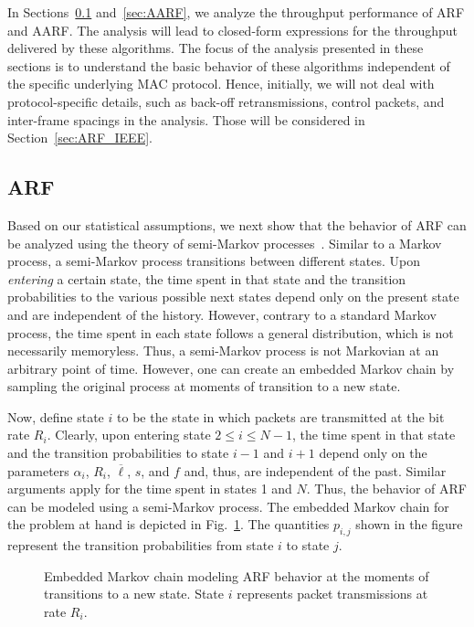\documentclass[11pt, journal, letterpaper, oneside, onecolumn]{IEEEtran}
\newcommand{\linegap}{1}
\begin{document}
In Sections~\ref{sec:ARF} and~\ref{sec:AARF},  we analyze the throughput performance of ARF and AARF. The analysis will lead to closed-form expressions for the
throughput delivered by these algorithms. The focus of the
analysis presented in these sections is to understand the basic
behavior of these algorithms independent of the specific underlying
MAC protocol. Hence, initially, we will not deal with protocol-specific
details, such as back-off retransmissions, control packets, and inter-frame spacings in the analysis. Those will be considered in Section~\ref{sec:ARF_IEEE}.

\subsection{ARF}
\label{sec:ARF}

Based on our statistical assumptions, we next show that the behavior
of ARF can be analyzed using the theory of semi-Markov
processes~\cite{ROSS}. Similar to a Markov process, a semi-Markov
process transitions between different states. Upon \emph{entering} a
certain state, the time spent in that state and the transition
probabilities to the various possible next states depend only on the
present state and are independent of the history. However, contrary
to a standard Markov process, the time spent in each state follows a
general distribution, which is not necessarily memoryless. Thus, a
semi-Markov process is not Markovian at an arbitrary point of time.
However, one can create an embedded Markov chain by sampling the
original process at moments of transition to a new state.

Now, define state $i$ to be the state in which packets are
transmitted at the bit rate $R_i$. Clearly, upon entering state $2
\leq i \leq N-1$, the time spent in that state and the transition
probabilities to state $i-1$ and $i+1$ depend only on the
parameters $\alpha_i$, $R_i$, $\overline{\ell}$, $s$,  and $f$
and, thus, are independent of the past.
Similar arguments apply for the time spent in states 1 and $N$.
Thus, the  behavior of ARF can be modeled using a semi-Markov
process. The embedded Markov chain for the problem at hand is
depicted in Fig.~\ref{fig:ARF-Macro}. The quantities $p_{i,j}$
shown in the figure represent the transition probabilities from
state $i$ to state $j$.

\begin{figure}[t]
\centering
{}
\caption{Embedded Markov chain modeling  ARF behavior at the
moments of transitions to a new state. State $i$ represents packet
transmissions at rate $R_i$.} \label{contblock}
\label{fig:ARF-Macro}
\end{figure}\renewcommand{\baselinestretch}{\linegap}
\end{document}
